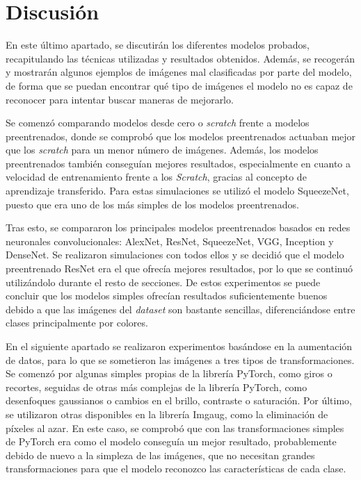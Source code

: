 \documentclass{report}
\begin{document}
\newpage
\section{Discusión}

En este último apartado, se discutirán los diferentes modelos probados, recapitulando las técnicas utilizadas y resultados obtenidos. Además, se recogerán y mostrarán algunos ejemplos de imágenes mal clasificadas por parte del modelo, de forma que se puedan encontrar qué tipo de imágenes el modelo no es capaz de reconocer para intentar buscar maneras de mejorarlo.


Se comenzó comparando modelos desde cero o \textit{scratch} frente a modelos preentrenados, donde se comprobó que los modelos preentrenados actuaban mejor que los \textit{scratch} para un menor número de imágenes. Además, los modelos preentrenados también conseguían mejores resultados, especialmente en cuanto a velocidad de entrenamiento frente a los \textit{Scratch}, gracias al concepto de aprendizaje transferido. Para estas simulaciones se utilizó el modelo SqueezeNet, puesto que era uno de los más simples de los modelos preentrenados.

Tras esto, se compararon los principales modelos preentrenados basados en redes neuronales convolucionales: AlexNet, ResNet, SqueezeNet, VGG, Inception y DenseNet. Se realizaron simulaciones con todos ellos y se decidió que el modelo preentrenado ResNet era el que ofrecía mejores resultados, por lo que se continuó utilizándolo durante el resto de secciones. De estos experimentos se puede concluir que los modelos simples ofrecían resultados suficientemente buenos debido a que las imágenes del \textit{dataset} son bastante sencillas, diferenciándose entre clases principalmente por colores.

En el siguiente apartado se realizaron experimentos basándose en la aumentación de datos, para lo que se sometieron las imágenes a tres tipos de transformaciones. Se comenzó por algunas simples propias de la librería PyTorch, como giros o recortes, seguidas de otras más complejas de la librería PyTorch, como desenfoques gaussianos o  cambios en el brillo, contraste o saturación. Por último, se utilizaron otras disponibles en la librería Imgaug, como la eliminación de píxeles al azar. En este caso, se comprobó que con las transformaciones simples de PyTorch era como el modelo conseguía un mejor resultado, probablemente debido de nuevo a la simpleza de las imágenes, que no necesitan grandes transformaciones para que el modelo reconozco las características de cada clase.
\end{document}
